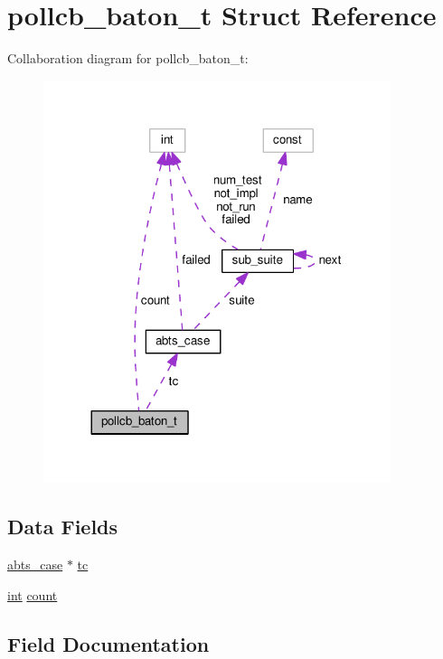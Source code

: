 \hypertarget{structpollcb__baton__t}{}\section{pollcb\+\_\+baton\+\_\+t Struct Reference}
\label{structpollcb__baton__t}


Collaboration diagram for pollcb\+\_\+baton\+\_\+t\+:
\nopagebreak
\begin{figure}[H]
\begin{center}
\leavevmode
\includegraphics[width=288pt]{structpollcb__baton__t__coll__graph}
\end{center}
\end{figure}
\subsection*{Data Fields}
\begin{DoxyCompactItemize}
\item 
\hyperlink{structabts__case}{abts\+\_\+case} $\ast$ \hyperlink{structpollcb__baton__t_a41e5ed8e2c9436bbc8f0a00c280ebba1}{tc}
\item 
\hyperlink{pcre_8txt_a42dfa4ff673c82d8efe7144098fbc198}{int} \hyperlink{structpollcb__baton__t_a924428012234a346cd47119588a95c6c}{count}
\end{DoxyCompactItemize}


\subsection{Field Documentation}
